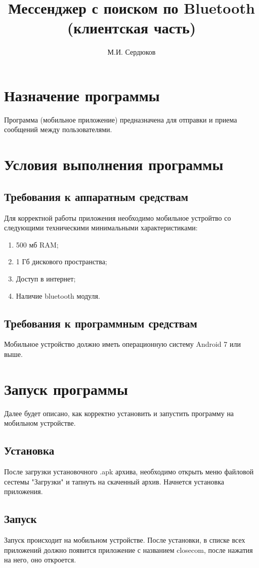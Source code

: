 \documentclass[opermanual]{espd}
\author{М.И. Сердюков}
\title{Мессенджер с поиском по Bluetooth\\(клиентская часть)}
\begin{document}
\tableofcontents

\section{Назначение программы}
Программа (мобильное приложение) предназначена для отправки и приема сообщений между пользователями. 

\section{Условия выполнения программы}
\subsection{Требования к аппаратным средствам}
Для корректной работы приложения необходимо мобильное устройтво со следующими техническими минимальными характеристиками:
\begin{enumerate}
\item 500 мб RAM;
\item 1 Гб дискового пространства;
\item Доступ в интернет;
\item Наличие bluetooth модуля.
\end{enumerate}

\subsection{Требования к программным средствам}
Мобильное устройство должно иметь операционную систему Android 7 или выше. 

\section{Запуск программы}
Далее будет описано, как корректно установить и запустить программу на мобильном устройстве.

\subsection{Установка}
После загрузки установочного .apk архива, необходимо открыть меню файловой сестемы "Загрузки" и тапнуть на скаченный архив. Начнется установка приложения.

\subsection{Запуск}
Запуск происходит на мобильном устройстве. После установки, в списке всех приложений должно появится приложение с названием closecom, после нажатия на него, оно откроется.
\end{document}
